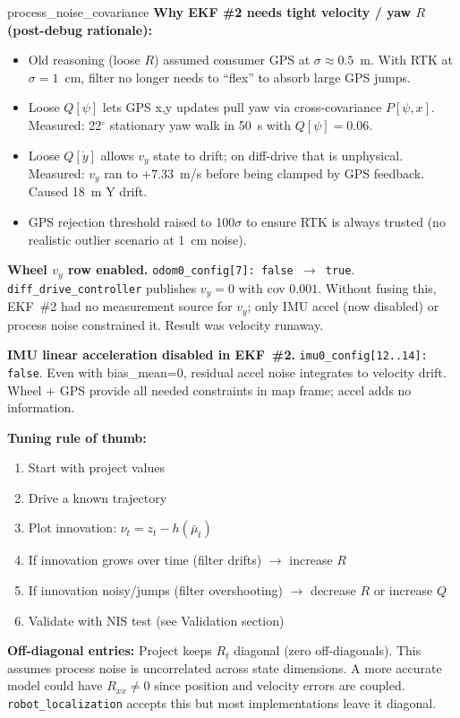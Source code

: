 \documentclass[11pt,a4paper]{article}
\begin{document}
\begin{paramcard}{process\_noise\_covariance}
\textbf{Why EKF \#2 needs tight velocity / yaw $R$ (post-debug rationale):}
\begin{itemize}
\item Old reasoning (loose $R$) assumed consumer GPS at $\sigma\!\approx\!0.5$~m. With RTK at $\sigma\!=\!1$~cm, filter no longer needs to ``flex'' to absorb large GPS jumps.
\item Loose $Q[\psi]$ lets GPS x,y updates pull yaw via cross-covariance $P[\psi, x]$. Measured: 22$^\circ$ stationary yaw walk in 50~s with $Q[\psi]=0.06$.
\item Loose $Q[\dot{y}]$ allows $v_y$ state to drift; on diff-drive that is unphysical. Measured: $v_y$ ran to $+7.33$~m/s before being clamped by GPS feedback. Caused 18~m Y drift.
\item GPS rejection threshold raised to 100$\sigma$ to ensure RTK is always trusted (no realistic outlier scenario at 1~cm noise).
\end{itemize}

\textbf{Wheel $v_y$ row enabled.} \texttt{odom0\_config[7]: false $\to$ true}. \texttt{diff\_drive\_controller} publishes $v_y\!=\!0$ with cov $0.001$. Without fusing this, EKF~\#2 had no measurement source for $v_y$; only IMU accel (now disabled) or process noise constrained it. Result was velocity runaway.

\textbf{IMU linear acceleration disabled in EKF~\#2.} \texttt{imu0\_config[12..14]: false}. Even with bias\_mean=0, residual accel noise integrates to velocity drift. Wheel + GPS provide all needed constraints in map frame; accel adds no information.

\textbf{Tuning rule of thumb:}
\begin{enumerate}
\item Start with project values
\item Drive a known trajectory
\item Plot innovation: $\nu_t = z_t - h(\bar{\mu}_t)$
\item If innovation grows over time (filter drifts) $\to$ increase $R$
\item If innovation noisy/jumps (filter overshooting) $\to$ decrease $R$ or increase $Q$
\item Validate with NIS test (see Validation section)
\end{enumerate}

\textbf{Off-diagonal entries:} Project keeps $R_t$ diagonal (zero off-diagonals). This assumes process noise is uncorrelated across state dimensions. A more accurate model could have $R_{x \dot{x}} \neq 0$ since position and velocity errors are coupled. \texttt{robot\_localization} accepts this but most implementations leave it diagonal.
\end{paramcard}
\end{document}
